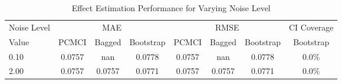 \begin{table}[htbp]
\centering
\caption{Effect Estimation Performance for Varying Noise Level}
\label{tab:noise_performance}
\begin{tabular}{l|ccc|ccc|c}
\hline
Noise Level & \multicolumn{3}{c|}{MAE} & \multicolumn{3}{c|}{RMSE} & CI Coverage \\
 Value & PCMCI & Bagged & Bootstrap & PCMCI & Bagged & Bootstrap & Bootstrap \\
\hline
0.10 & 0.0757 & nan & 0.0778 & 0.0757 & nan & 0.0778 & 0.0\% \\
2.00 & 0.0757 & 0.0757 & 0.0771 & 0.0757 & 0.0757 & 0.0771 & 0.0\% \\
\hline
\end{tabular}
\end{table}
